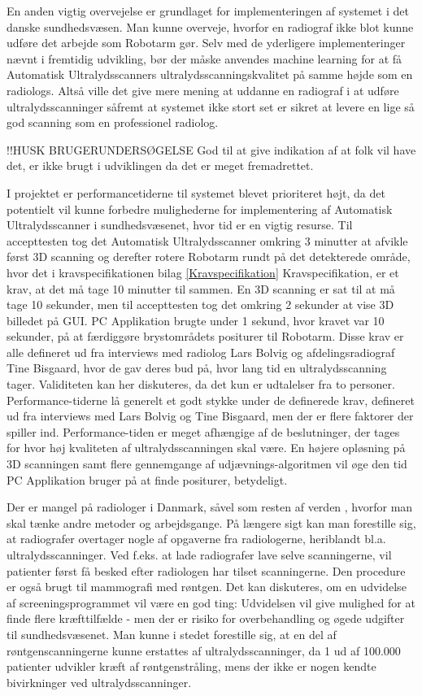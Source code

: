 En anden vigtig overvejelse er grundlaget for implementeringen af systemet i det danske sundhedsvæsen. Man kunne overveje, hvorfor en radiograf ikke blot kunne udføre det arbejde som Robotarm gør. Selv med de yderligere implementeringer nævnt i fremtidig udvikling, bør der måske anvendes machine learning for at få Automatisk Ultralydsscanners ultralydsscanningskvalitet på samme højde som en radiologs. Altså ville det give mere mening at uddanne en radiograf i at udføre ultralydsscanninger såfremt at systemet ikke stort set er sikret at levere en lige så god scanning som en professionel radiolog.

!!HUSK BRUGERUNDERSØGELSE
God til at give indikation af at folk vil have det, er ikke brugt i udviklingen da det er meget fremadrettet.

I projektet er performancetiderne til systemet blevet prioriteret højt, da det potentielt vil kunne forbedre mulighederne for implementering af Automatisk Ultralydsscanner i sundhedsvæsenet, hvor tid er en vigtig resurse. Til accepttesten tog det Automatisk Ultralydsscanner omkring 3 minutter at afvikle først 3D scanning og derefter rotere Robotarm rundt på det detekterede område, hvor det i kravspecifikationen bilag \ref{Kravspecifikation} Kravspecifikation, er et krav, at det må tage 10 minutter til sammen. En 3D scanning er sat til at må tage 10 sekunder, men til accepttesten tog det omkring 2 sekunder at vise 3D billedet på GUI. PC Applikation brugte under 1 sekund, hvor kravet var 10 sekunder, på at færdiggøre brystområdets positurer til Robotarm. Disse krav er alle defineret ud fra interviews med radiolog Lars Bolvig og afdelingsradiograf Tine Bisgaard, hvor de gav deres bud på, hvor lang tid en ultralydsscanning tager. Validiteten kan her diskuteres, da det kun er udtalelser fra to personer.
Performance-tiderne lå generelt et godt stykke under de definerede krav, defineret ud fra interviews med Lars Bolvig og  Tine Bisgaard, men der er flere faktorer der spiller ind. Performance-tiden er meget afhængige af de beslutninger, der tages for hvor høj kvaliteten af ultralydsscanningen skal være. En højere opløsning på 3D scanningen samt flere gennemgange af udjævnings-algoritmen vil øge den tid PC Applikation bruger på at finde positurer, betydeligt.  

Der er mangel på radiologer i Danmark, såvel som resten af verden \cite{Lagemangel}, hvorfor man skal tænke andre metoder og arbejdsgange. På længere sigt kan man forestille sig, at radiografer overtager nogle af opgaverne fra radiologerne, heriblandt bl.a. ultralydsscanninger. Ved f.eks. at lade radiografer lave selve scanningerne, vil patienter først få besked efter radiologen har tilset scanningerne. Den procedure er også brugt til mammografi med røntgen. Det kan diskuteres, om en udvidelse af screeningsprogrammet vil være en god ting: Udvidelsen vil give mulighed for at finde flere kræfttilfælde - men der er risiko for overbehandling og øgede udgifter til sundhedsvæsenet. Man kunne i stedet forestille sig, at en del af røntgenscanningerne kunne erstattes af ultralydsscanninger, da 1 ud af 100.000 \cite{Risk} patienter udvikler kræft af røntgenstråling, mens der ikke er nogen kendte bivirkninger ved ultralydsscanninger.

